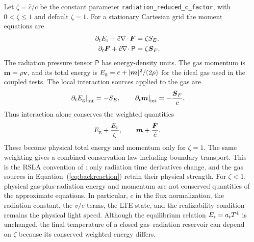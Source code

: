 \documentclass[manuscript]{aastex7}
\newcommand{\vct}[1]{\boldsymbol{#1}}
\newcommand{\Er}{E_{\rm r}}
\newcommand{\Eg}{E_{\rm g}}
\newcommand{\Fr}{\vct{F}}
\newcommand{\Prad}{\mathsf{P}}
\newcommand{\ar}{a_{\rm r}}
\newcommand{\chat}{\hat{c}}
\newcommand{\code}[1]{\texttt{#1}}
\begin{document}
Let $\zeta=\chat/c$ be the constant parameter
\code{radiation\_reduced\_c\_factor}, with $0<\zeta\leq1$ and default
$\zeta=1$. For a stationary Cartesian grid the moment equations are
\begin{align}
 \partial_t\Er+\chat\nabla\!\cdot\Fr &= \zeta S_E,\label{eq:energy}\\
 \partial_t\Fr+\chat\nabla\!\cdot\Prad &= \zeta\vct{S}_F.\label{eq:momentum}
\end{align}
The radiation pressure tensor $\Prad$ has energy-density units. The gas
momentum is $\vct{m}=\rho\vct{v}$, and its total energy is
$\Eg=e+|\vct{m}|^2/(2\rho)$ for the ideal gas used in the coupled tests.
The local interaction sources applied to the gas are
\begin{equation}
 \left.\partial_t\Eg\right|_{\rm int}=-S_E,
 \qquad
 \left.\partial_t\vct{m}\right|_{\rm int}=-\frac{\vct{S}_F}{c}.
 \label{eq:backreaction}
\end{equation}
Thus interaction alone conserves the weighted quantities
\begin{equation}
 \Eg+\frac{\Er}{\zeta},\qquad \vct{m}+\frac{\Fr}{\chat}.
 \label{eq:weighted}
\end{equation}
These become physical total energy and momentum only for $\zeta=1$.
The same weighting gives a combined conservation law including boundary
transport. This is the RSLA convention of \citet{SkinnerOstriker2013}:
only radiation time derivatives change, and the gas sources in
Equation~(\ref{eq:backreaction}) retain their physical strength.
For $\zeta<1$, physical gas-plus-radiation energy and momentum are not
conserved quantities of the approximate equations. In particular, $c$
in the flux normalization, the radiation constant, the $v/c$ terms,
the LTE state, and the realizability condition remains the physical
light speed.
Although the equilibrium relation $\Er=\ar T^4$ is unchanged, the final
temperature of a closed gas--radiation reservoir can depend on $\zeta$
because its conserved weighted energy differs.
\end{document}
